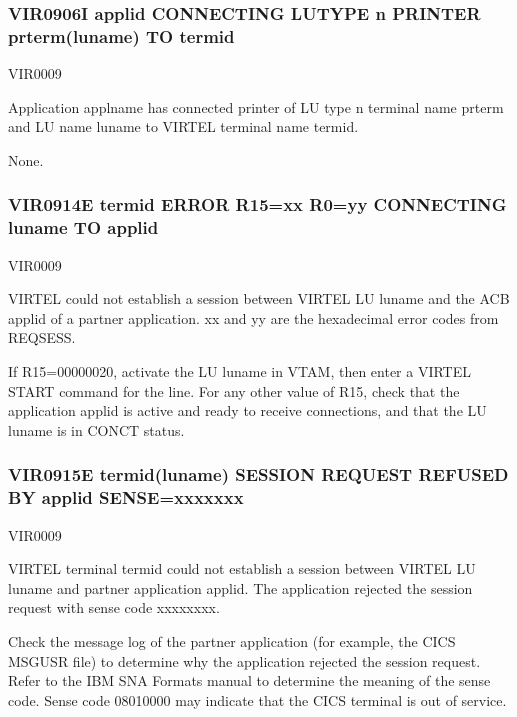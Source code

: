 \documentclass[letterpaper,10pt,english]{sphinxmanual}
\begin{document}
\subsubsection{VIR0906I applid CONNECTING LUTYPE n PRINTER prterm(luname) TO termid}
\label{\detokenize{messages:vir0906i-applid-connecting-lutype-n-printer-prterm-luname-to-termid}}\begin{description}
\sphinxAtStartPar
VIR0009

\sphinxAtStartPar
Application applname has connected printer of LU type n terminal name prterm and LU name luname to VIRTEL terminal name termid.

\sphinxAtStartPar
None.

\end{description}


\subsubsection{VIR0914E termid ERROR R15=xx R0=yy CONNECTING luname TO applid}
\label{\detokenize{messages:vir0914e-termid-error-r15-xx-r0-yy-connecting-luname-to-applid}}\begin{description}
\sphinxAtStartPar
VIR0009

\sphinxAtStartPar
VIRTEL could not establish a session between VIRTEL LU luname and the ACB applid of a partner application. xx and yy are the hexadecimal error codes from REQSESS.

\sphinxAtStartPar
If R15=00000020, activate the LU luname in VTAM, then enter a VIRTEL START command for the line. For any other value of R15, check that the application applid is active and ready to receive connections, and that the LU luname is in CONCT status.

\end{description}


\subsubsection{VIR0915E termid(luname) SESSION REQUEST REFUSED BY applid SENSE=xxxxxxx}
\label{\detokenize{messages:vir0915e-termid-luname-session-request-refused-by-applid-sense-xxxxxxx}}\begin{description}
\sphinxAtStartPar
VIR0009

\sphinxAtStartPar
VIRTEL terminal termid could not establish a session between VIRTEL LU luname and partner application applid. The application rejected the session request with sense code xxxxxxxx.

\sphinxAtStartPar
Check the message log of the partner application (for example, the CICS MSGUSR file) to determine why the application rejected the session request. Refer to the IBM SNA Formats manual to determine the meaning of the sense code. Sense code 08010000 may indicate that the CICS terminal is out of service.

\end{description}
\end{document}
